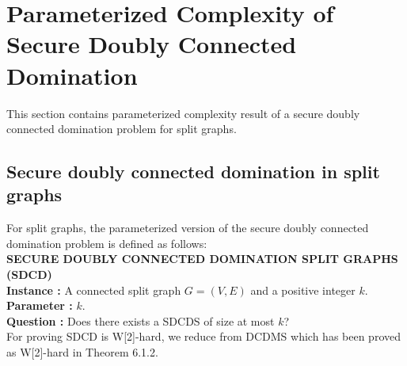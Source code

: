 \section{Parameterized Complexity of Secure Doubly Connected Domination}
\noindent
This section contains parameterized complexity result of a secure doubly connected domination problem for split graphs. 
\subsection{Secure doubly connected domination in split graphs}
\noindent For split graphs, the parameterized version of the secure doubly connected domination problem is defined as follows:\\ 
 \textbf{SECURE DOUBLY CONNECTED DOMINATION SPLIT GRAPHS (SDCD)}\\
\indent \textbf{Instance :} A connected split graph $G=(V,E)$ and a positive integer $k$.\\
\indent \textbf{Parameter :} $k$.\\
\indent \textbf{Question :} Does there exists a SDCDS of size at most $k$?\\
For proving SDCD is W[2]-hard, we reduce from DCDMS which has been proved as W[2]-hard in Theorem 6.1.2.

